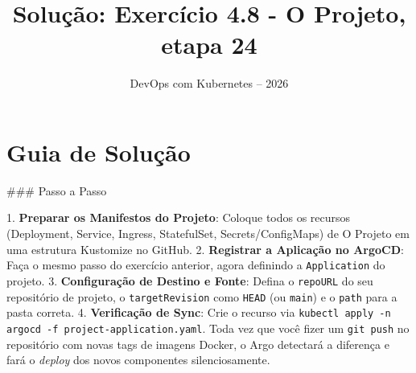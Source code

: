 \documentclass[11pt,a4paper]{article}
\title{\color{secondary}\Huge\textbf{Solução: Exercício 4.8 - O Projeto, etapa 24}}
\author{\color{primary}DevOps com Kubernetes -- 2026}
\date{}
\begin{document}
\maketitle

\section*{\color{primary}Guia de Solução}
\begin{tcolorbox}[colback=green!5!white,colframe=green!60!black,title=Resolução Passo a Passo]
### Passo a Passo

1. \textbf{Preparar os Manifestos do Projeto}: Coloque todos os recursos (Deployment, Service, Ingress, StatefulSet, Secrets/ConfigMaps) de O Projeto em uma estrutura Kustomize no GitHub.
2. \textbf{Registrar a Aplicação no ArgoCD}: Faça o mesmo passo do exercício anterior, agora definindo a \texttt{Application} do projeto.
3. \textbf{Configuração de Destino e Fonte}: Defina o \texttt{repoURL} do seu repositório de projeto, o \texttt{targetRevision} como \texttt{HEAD} (ou \texttt{main}) e o \texttt{path} para a pasta correta.
4. \textbf{Verificação de Sync}: Crie o recurso via \texttt{kubectl apply -n argocd -f project-application.yaml}. Toda vez que você fizer um \texttt{git push} no repositório com novas tags de imagens Docker, o Argo detectará a diferença e fará o \textit{deploy} dos novos componentes silenciosamente.
\end{tcolorbox}
\end{document}
